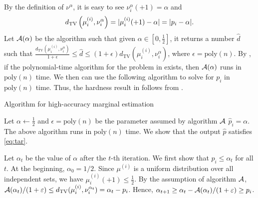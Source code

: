 By the definition of $\nu^\alpha$, it is easy to see $\nu^\alpha_i(+1) = \alpha$  and
\begin{align*}
    d_{\mathrm{TV}}\left({\mu^{(i)}_i},{\nu^\alpha_i}\right) = \vert \mu^{(i)}_i(+1) - \alpha \vert = \vert p_i - \alpha \vert.
\end{align*}
Let $\mathcal{A}(\alpha)$ be the algorithm such that given $\alpha \in [0,\frac{1}{2}]$, it returns a number $\hat{d}$ such that $ \frac{d_{\text{TV}}(\mu^{(i)}_i,\nu^\alpha_i)}{1+\epsilon}\leq \hat{d} \leq (1+\epsilon)d_{\text{TV}}(\mu^{(i)}_i,\nu^\alpha_i)$, where $\epsilon = \mathrm{poly}(n)$. By , if the polynomial-time algorithm for the problem in  exists, then $\mathcal{A}(\alpha)$ runs in $\mathrm{poly}(n)$ time.
We then can use the following algorithm to solve  for $p_i$ in $\mathrm{poly}(n)$ time. Thus, the hardness result in  follows from .

\label{alg:high-TV}
    \caption{Algorithm for high-accuracy marginal estimation}
    Let $\alpha \gets \frac{1}{2}$ and $\epsilon = \mathrm{poly}(n)$ be the parameter assumed by algorithm $\mathcal{A}$\;
    \Return $\hat{p}_i = \alpha$.
The above algorithm runs in $\mathrm{poly}(n)$ time. We show that the output $\hat{p}$ satisfies \eqref{eq:tar}.


Let $\alpha_t$ be the value of $\alpha$ after the $t$-th iteration. We first show that $p_i \leq \alpha_t$ for all $t$. 
 At the beginning, $\alpha_0 = 1/2$. Since $\mu^{(i)}$ is a uniform distribution over all independent sets, we have $\mu^{(i)}_i(+1) \leq \frac{1}{2}$. By the assumption of algorithm $\mathcal{A}$, $\mathcal{A}(\alpha_{t})/(1+\varepsilon) \leq  d_{\text{TV}}(\mu^{(i)}_i,\nu^{\alpha_t}_i) = \alpha_t - p_i$. Hence, $\alpha_{t+1} \geq \alpha_t -  \mathcal{A}(\alpha_{t})/(1+\varepsilon) \geq p_i $. 
 
